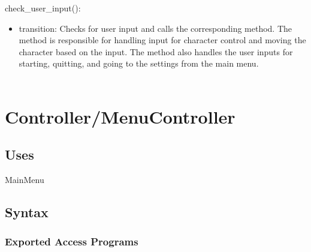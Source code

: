 \documentclass[12pt]{article}
\begin{document}
\noindent check\_user\_input():
\begin{itemize}
    \item transition: Checks for user input and calls the corresponding method. The method is responsible for handling input for character control and moving the character based on the input. The method also handles the user inputs for starting, quitting, and going to the settings from the main menu. \\\\
\end{itemize}

\newpage
\section*{Controller/MenuController}

\subsection* {Uses}

MainMenu

\subsection* {Syntax}

\subsubsection* {Exported Access Programs}
\end{document}
